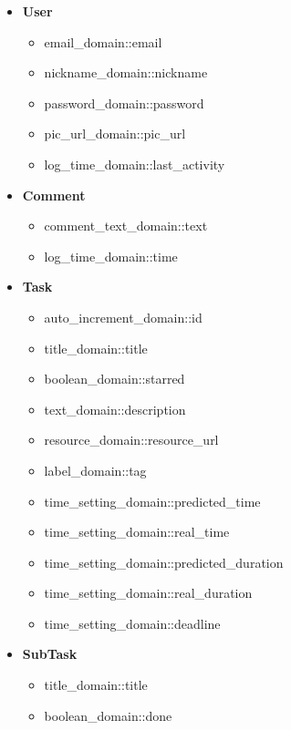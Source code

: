 \documentclass{article}
\begin{document}
\begin{itemize}
\item \textbf{User}

	\begin{itemize}
	
	\item email\_domain::email
	
	\item nickname\_domain::nickname
	
	\item password\_domain::password
	
	\item pic\_url\_domain::pic\_url
	
	\item log\_time\_domain::last\_activity
	\end{itemize}
	
\item \textbf{Comment}

	\begin{itemize}
	\item comment\_text\_domain::text
	\item log\_time\_domain::time
	\end{itemize}
	
\item \textbf{Task}

	\begin{itemize}
	\item auto\_increment\_domain::id
	\item title\_domain::title
	\item boolean\_domain::starred
	\item text\_domain::description
	\item resource\_domain::resource\_url
	\item label\_domain::tag
	\item time\_setting\_domain::predicted\_time
	\item time\_setting\_domain::real\_time
	\item time\_setting\_domain::predicted\_duration
	\item time\_setting\_domain::real\_duration
	\item time\_setting\_domain::deadline
	\end{itemize}
	
\item \textbf{SubTask}

	\begin{itemize}
	\item title\_domain::title
	\item boolean\_domain::done
	\end{itemize}
	

\end{itemize}
\end{document}

